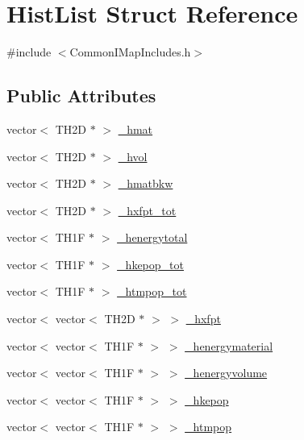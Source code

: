 \hypertarget{struct_hist_list}{\section{Hist\-List Struct Reference}
\label{struct_hist_list}
}


{\ttfamily \#include $<$Common\-I\-Map\-Includes.\-h$>$}

\subsection*{Public Attributes}
\begin{DoxyCompactItemize}
\item 
vector$<$ T\-H2\-D $\ast$ $>$ \hyperlink{struct_hist_list_ac3388ca64a9d4835da79f8ead974b390}{\-\_\-hmat}
\item 
vector$<$ T\-H2\-D $\ast$ $>$ \hyperlink{struct_hist_list_a9a339d26f7ae5dd2133f50561a9ad66a}{\-\_\-hvol}
\item 
vector$<$ T\-H2\-D $\ast$ $>$ \hyperlink{struct_hist_list_adf971866b4d568c49110a6e0fc3e0cc8}{\-\_\-hmatbkw}
\item 
vector$<$ T\-H2\-D $\ast$ $>$ \hyperlink{struct_hist_list_a763d9aa28ae4077b048c5417db59cea6}{\-\_\-hxfpt\-\_\-tot}
\item 
vector$<$ T\-H1\-F $\ast$ $>$ \hyperlink{struct_hist_list_a68a0662b12892ababb9e0e10f8605415}{\-\_\-henergytotal}
\item 
vector$<$ T\-H1\-F $\ast$ $>$ \hyperlink{struct_hist_list_a40a0f18234c183dc824b1aab79418963}{\-\_\-hkepop\-\_\-tot}
\item 
vector$<$ T\-H1\-F $\ast$ $>$ \hyperlink{struct_hist_list_a494415937bc68c1e5693516cf0ba3308}{\-\_\-htmpop\-\_\-tot}
\item 
vector$<$ vector$<$ T\-H2\-D $\ast$ $>$ $>$ \hyperlink{struct_hist_list_af04270635ae8c17225b70dc71a012751}{\-\_\-hxfpt}
\item 
vector$<$ vector$<$ T\-H1\-F $\ast$ $>$ $>$ \hyperlink{struct_hist_list_a564e91e80b3034576f04fac4c2ee6526}{\-\_\-henergymaterial}
\item 
vector$<$ vector$<$ T\-H1\-F $\ast$ $>$ $>$ \hyperlink{struct_hist_list_a0299555f2a7f77bff06903ae8a83612f}{\-\_\-henergyvolume}
\item 
vector$<$ vector$<$ T\-H1\-F $\ast$ $>$ $>$ \hyperlink{struct_hist_list_acc57842a9e28b92139e8d0afac128116}{\-\_\-hkepop}
\item 
vector$<$ vector$<$ T\-H1\-F $\ast$ $>$ $>$ \hyperlink{struct_hist_list_a90356e2c271e5be23bc283fc5886a948}{\-\_\-htmpop}

\end{DoxyCompactItemize}
